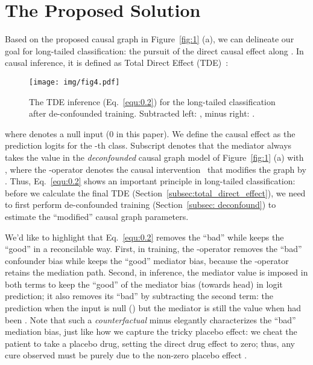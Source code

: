 \documentclass{article}
\begin{document}
\section{The Proposed Solution}
\label{sec:proposed_method}
Based on the proposed causal graph in Figure~\ref{fig:1} (a), we can delineate our goal for long-tailed classification:  the pursuit of the direct causal effect along . In causal inference, it is defined as Total Direct Effect (TDE)~\cite{vanderweele2013three, pearl2001direct}:



\begin{wrapfigure}{r}{6cm}
\texttt{[image: img/fig4.pdf]}
\vspace{-3mm}
\caption{The TDE inference (Eq.~\eqref{equ:0.2}) for the long-tailed classification after de-confounded training. Subtracted left: , minus right: .}
\label{fig:4}
\vspace{-5mm}
\end{wrapfigure}
where  denotes a null input (0 in this paper). We define the causal effect as the prediction logits  for the -th class. Subscript  denotes that the mediator  always takes the value  in the \emph{deconfounded} causal graph model of Figure~\ref{fig:1} (a) with , where the -operator denotes the causal intervention~\cite{pearl2016causal} that modifies the graph by . Thus, Eq.~\eqref{equ:0.2} shows an important principle in long-tailed classification: before we calculate the final TDE (Section~\ref{subsec:total_direct_effect}), we need to first perform de-confounded training (Section~\ref{subsec: deconfound}) to estimate the ``modified'' causal graph parameters.

We'd like to highlight that Eq.~\eqref{equ:0.2} removes the ``bad'' while keeps the ``good'' in a reconcilable way. First, in training, the -operator removes the ``bad'' confounder bias while keeps the ``good'' mediator bias, because the -operator retains the mediation path. Second, in inference, the mediator value  is imposed in both terms to keep the ``good'' of the mediator bias (towards head) in logit prediction; it also removes its ``bad'' by subtracting the second term: the prediction when the input  is null () but the mediator  is still the value  when  had been . Note that such a \emph{counterfactual} minus elegantly characterizes the ``bad'' mediation bias, just like how we capture the tricky placebo effect: we cheat the patient to take a placebo drug, setting the direct drug effect  to zero; thus, any cure observed must be purely due to the non-zero placebo effect .
\end{document}

